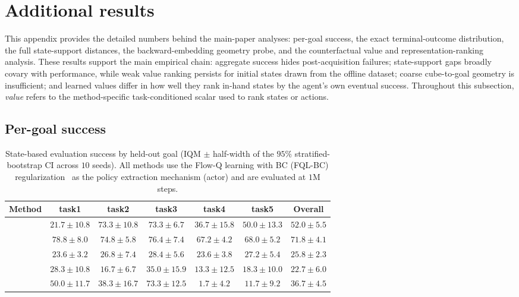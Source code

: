 \section{Additional results}
\label{app:tables}

This appendix provides the detailed numbers behind the main-paper analyses: per-goal success, the exact terminal-outcome distribution, the full
state-support distances, the backward-embedding geometry probe, and the counterfactual value and representation-ranking analysis.
These results support the main empirical chain: aggregate success hides post-acquisition failures; state-support gaps broadly covary with performance, while weak value ranking persists for initial states drawn from the offline dataset; coarse cube-to-goal geometry is insufficient; and learned values
differ in how well they rank in-hand states by the agent's own eventual success.
Throughout this subsection, \emph{value} refers to the method-specific task-conditioned scalar used to rank states or actions.

\subsection{Per-goal success}
\label{app:pertask}

\begin{table}[H]
\centering
\caption{State-based evaluation success by held-out goal (IQM $\pm$ half-width of the $95\%$ stratified-bootstrap CI across $10$ seeds). 
All methods use the Flow-Q learning with BC (FQL-BC) regularization~\citep{park-icml25a,bagatella-iclr26a} as the policy extraction mechanism (actor) and are evaluated at $1$M steps.}
\label{tab:pertask}
\begin{tabular}{lcccccc}
\toprule
\textbf{Method} & \textbf{task1} & \textbf{task2} & \textbf{task3} & \textbf{task4} & \textbf{task5} & \textbf{Overall} \\
\midrule
\fb{}    & $21.7 \pm 10.8$ & $73.3 \pm 10.8$ & $73.3 \pm 6.7$  & $36.7 \pm 15.8$ & $50.0 \pm 13.3$ & $52.0 \pm 5.5$ \\
\gciql{} & $78.8 \pm 8.0$  & $74.8 \pm 5.8$  & $76.4 \pm 7.4$  & $67.2 \pm 4.2$  & $68.0 \pm 5.2$  & $71.8 \pm 4.1$ \\
\crl{}   & $23.6 \pm 3.2$  & $26.8 \pm 7.4$  & $28.4 \pm 5.6$  & $23.6 \pm 3.8$  & $27.2 \pm 5.4$  & $25.8 \pm 2.3$ \\
\rldp{}  & $28.3 \pm 10.8$ & $16.7 \pm 6.7$  & $35.0 \pm 15.9$ & $13.3 \pm 12.5$ & $18.3 \pm 10.0$ & $22.7 \pm 6.0$ \\
\psm{}   & $50.0 \pm 11.7$ & $38.3 \pm 16.7$ & $73.3 \pm 12.5$ & $1.7 \pm 4.2$   & $11.7 \pm 9.2$  & $36.7 \pm 4.5$ \\
\bottomrule
\end{tabular}
\end{table}

